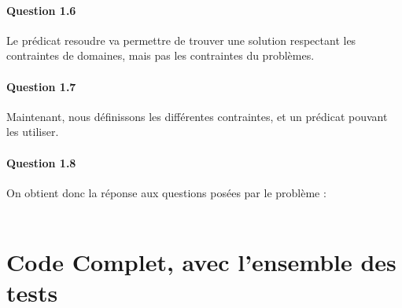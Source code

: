 \documentclass[11pt]{article} %
\begin{document}
\paragraph{Question 1.6}
Le prédicat resoudre va permettre de trouver une solution respectant les contraintes de domaines, mais pas les contraintes du problèmes.

\paragraph{Question 1.7}
Maintenant, nous définissons les différentes contraintes, et un prédicat pouvant les utiliser.


\paragraph{Question 1.8}
On obtient donc la réponse aux questions posées par le problème : \\\\
\newpage

\section{Code Complet, avec l'ensemble des tests}

\end{document}
